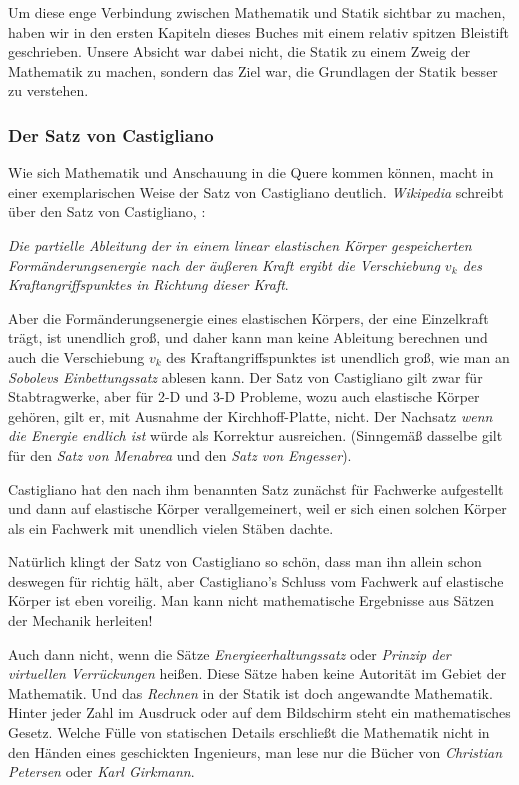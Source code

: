 Um diese enge Verbindung zwischen Mathematik und Statik sichtbar zu machen, haben wir in den ersten Kapiteln dieses Buches mit einem relativ spitzen Bleistift geschrieben. Unsere Absicht war dabei nicht, die Statik zu einem Zweig der Mathematik zu machen, sondern das Ziel war, die Grundlagen der Statik besser zu verstehen.

{\textcolor{blau2}{\subsubsection*{Der Satz von Castigliano}}}
Wie sich Mathematik und Anschauung in die Quere kommen k\"{o}nnen, macht in einer exemplarischen Weise der Satz von Castigliano deutlich. {\em Wikipedia\/} schreibt \"{u}ber den Satz von Castigliano, \cite{Ca}:

{\em Die partielle Ableitung der in einem linear elastischen K\"{o}rper gespeicherten Form\"{a}nderungsenergie nach der \"{a}u{\ss}eren Kraft ergibt die Verschiebung $v_k$ des Kraftangriffspunktes in Richtung dieser Kraft\/}.

Aber die Form\"{a}nderungsenergie eines elastischen K\"{o}rpers, der eine Einzelkraft tr\"{a}gt, ist unendlich gro{\ss}, und daher kann man keine Ableitung berechnen und auch die Verschiebung $v_k$ des Kraftangriffspunktes ist unendlich gro{\ss}, wie man an {\em Sobolevs Einbettungssatz\/} ablesen kann. Der Satz von Castigliano gilt zwar f\"{u}r Stabtragwerke, aber f\"{u}r 2-D und 3-D Probleme, wozu auch elastische K\"{o}rper geh\"{o}ren, gilt er, mit Ausnahme der Kirchhoff-Platte, nicht. Der Nachsatz {\em\glq wenn die Energie endlich ist\grq{}\/} w\"{u}rde als Korrektur ausreichen. (Sinngem\"{a}{\ss} dasselbe gilt f\"{u}r den {\em Satz von Menabrea\/} und den {\em Satz von Engesser\/}).

Castigliano hat den nach ihm benannten Satz zun\"{a}chst f\"{u}r Fachwerke aufgestellt und dann auf elastische K\"{o}rper verallgemeinert, weil er sich einen solchen K\"{o}rper als ein Fachwerk mit unendlich vielen St\"{a}ben dachte.

Nat\"{u}rlich klingt der Satz von Castigliano so sch\"{o}n, dass man ihn allein schon deswegen f\"{u}r richtig h\"{a}lt, aber Castigliano's Schluss vom Fachwerk auf elastische K\"{o}rper ist eben voreilig. Man kann nicht mathematische Ergebnisse aus S\"{a}tzen der Mechanik herleiten!

Auch dann nicht, wenn die S\"{a}tze {\em Energieerhaltungssatz\/} oder {\em Prinzip der virtuellen Verr\"{u}ckungen\/} hei{\ss}en. Diese S\"{a}tze haben keine Autorit\"{a}t im Gebiet der Mathematik. Und das {\em Rechnen\/} in der Statik ist doch angewandte Mathematik. Hinter jeder Zahl im Ausdruck oder auf dem Bildschirm steht ein mathematisches Gesetz. Welche F\"{u}lle von statischen Details erschlie{\ss}t die Mathematik nicht in den H\"{a}nden eines geschickten Ingenieurs, man lese nur die B\"{u}cher von {\em Christian Petersen\/} oder {\em Karl Girkmann\/}.

